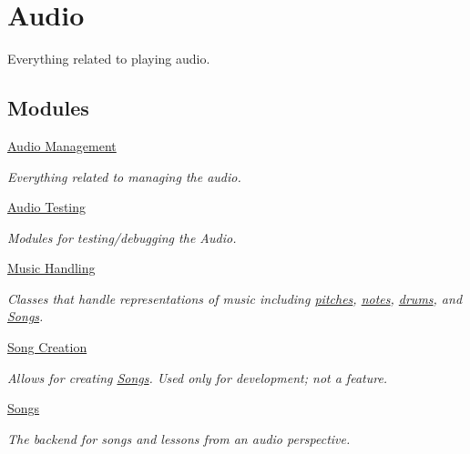 \hypertarget{group___audio}{}\section{Audio}
\label{group___audio}


Everything related to playing audio.  


\subsection*{Modules}
\begin{DoxyCompactItemize}
\item 
\hyperlink{group___audio_management}{Audio Management}
\begin{DoxyCompactList}\small\item\em Everything related to managing the audio. \end{DoxyCompactList}\item 
\hyperlink{group___audio_testing}{Audio Testing}
\begin{DoxyCompactList}\small\item\em Modules for testing/debugging the Audio. \end{DoxyCompactList}\item 
\hyperlink{group___doc_music_handling}{Music Handling}
\begin{DoxyCompactList}\small\item\em Classes that handle representations of music including \hyperlink{group___music_enums_ga508f69b199ea518f935486c990edac1d}{pitches}, \hyperlink{group___music_structs_struct_music_1_1_combined_note}{notes}, \hyperlink{group___music_enums_gade475b4382c7066d1af13e7c13c029b6}{drums}, and \hyperlink{class_song}{Songs}. \end{DoxyCompactList}\item 
\hyperlink{group___doc_s_c}{Song Creation}
\begin{DoxyCompactList}\small\item\em Allows for creating \hyperlink{class_song}{Songs}. Used only for development; not a feature. \end{DoxyCompactList}\item 
\hyperlink{group___song_group}{Songs}
\begin{DoxyCompactList}\small\item\em The backend for songs and lessons from an audio perspective. \end{DoxyCompactList}\end{DoxyCompactItemize}


